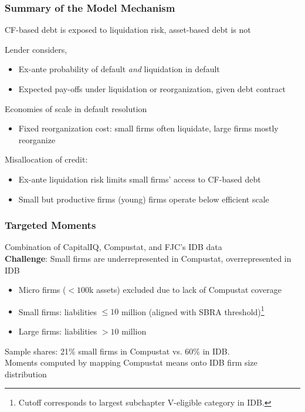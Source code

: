 \documentclass[aspectratio=169,xcolor=table]{beamer}
\begin{document}
\begin{frame}[label=mechanism] \frametitle{Summary of the Model Mechanism \hfill \hyperlink{Qfull}{}}

CF-based debt is exposed to liquidation risk, asset-based debt is not 

Lender considers,
\begin{itemize} \small
    \item Ex-ante probability of default \textit{and} liquidation in default
    \item Expected pay-offs under liquidation or reorganization, given debt contract
    \end{itemize} \normalsize \vspace{3mm} 


Economies of scale in default resolution
\begin{itemize} \small
    \item Fixed reorganization cost: small firms often liquidate, large firms mostly reorganize 
\end{itemize} \normalsize \vspace{3mm} 

Misallocation of credit:
\begin{itemize} \small
    \item Ex-ante liquidation risk limits small firms' access to CF-based debt
    \item Small but productive firms (young) firms operate below efficient scale 
\end{itemize} \normalsize


\end{frame}



\begin{frame}[label=targets] \frametitle{Targeted Moments \hfill \hyperlink{datasources}{}}
 
Combination of CapitalIQ, Compustat, and FJC's IDB data \vspace{3mm} \\
\textbf{Challenge}: Small firms are underrepresented in Compustat, overrepresented in IDB
\begin{itemize}
    \item Micro firms ($<100$k assets) excluded due to lack of Compustat coverage
    \item Small firms: liabilities $\leq 10$ million (aligned with SBRA threshold)\footnote{Cutoff corresponds to largest subchapter V-eligible category in IDB.}
    \item Large firms: liabilities $ > 10$ million
\end{itemize}
Sample shares: 21\% small firms in Compustat vs. 60\% in IDB. \vspace{3mm} \\
Moments computed by mapping Compustat means onto IDB firm size distribution


\end{frame}
\end{document}
